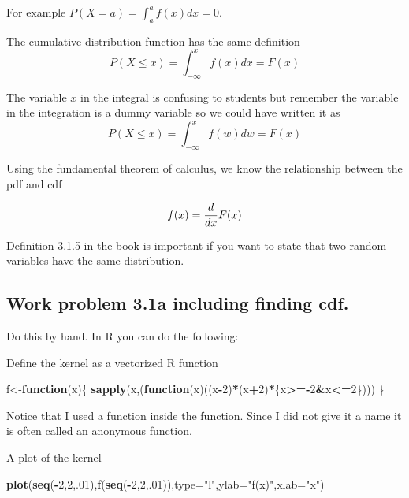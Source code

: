 \documentclass[]{book}
\newenvironment{Shaded}{\begin{snugshade}}{\end{snugshade}}
\newcommand{\KeywordTok}[1]{\textcolor[rgb]{0.13,0.29,0.53}{\textbf{#1}}}
\newcommand{\DataTypeTok}[1]{\textcolor[rgb]{0.13,0.29,0.53}{#1}}
\newcommand{\DecValTok}[1]{\textcolor[rgb]{0.00,0.00,0.81}{#1}}
\newcommand{\StringTok}[1]{\textcolor[rgb]{0.31,0.60,0.02}{#1}}
\newcommand{\ControlFlowTok}[1]{\textcolor[rgb]{0.13,0.29,0.53}{\textbf{#1}}}
\newcommand{\OperatorTok}[1]{\textcolor[rgb]{0.81,0.36,0.00}{\textbf{#1}}}
\newcommand{\NormalTok}[1]{#1}
\theoremstyle{definition}
\theoremstyle{definition}
\theoremstyle{definition}
\theoremstyle{remark}
\begin{document}
For example \(P(X=a)=\int_{a}^{a}f(x)dx=0\).

The cumulative distribution function has the same definition
\[P(X\leq x)=\int_{-\infty}^{x}f(x)dx=F(x)\]

The variable \(x\) in the integral is confusing to students but remember
the variable in the integration is a dummy variable so we could have
written it as\\
\[P(X\leq x)=\int_{-\infty}^{x}f(w)dw=F(x)\]

Using the fundamental theorem of calculus, we know the relationship
between the pdf and cdf

\[f(x)={d \over dx}F(x)\]

Definition 3.1.5 in the book is important if you want to state that two
random variables have the same distribution.

\subsection{Work problem 3.1a including finding
cdf.}\label{work-problem-3.1a-including-finding-cdf.}

Do this by hand. In R you can do the following:

Define the kernel as a vectorized R function

\begin{Shaded}
\begin{Highlighting}[]
\NormalTok{f<-}\ControlFlowTok{function}\NormalTok{(x)\{}
    \KeywordTok{sapply}\NormalTok{(x,(}\ControlFlowTok{function}\NormalTok{(x)((x}\OperatorTok{-}\DecValTok{2}\NormalTok{)}\OperatorTok{*}\NormalTok{(x}\OperatorTok{+}\DecValTok{2}\NormalTok{)}\OperatorTok{*}\NormalTok{\{x}\OperatorTok{>=-}\DecValTok{2}\OperatorTok{&}\NormalTok{x}\OperatorTok{<=}\DecValTok{2}\NormalTok{\})))}
\NormalTok{\}}
\end{Highlighting}
\end{Shaded}

Notice that I used a function inside the function. Since I did not give
it a name it is often called an anonymous function.

A plot of the kernel

\begin{Shaded}
\begin{Highlighting}[]
\KeywordTok{plot}\NormalTok{(}\KeywordTok{seq}\NormalTok{(}\OperatorTok{-}\DecValTok{2}\NormalTok{,}\DecValTok{2}\NormalTok{,.}\DecValTok{01}\NormalTok{),}\KeywordTok{f}\NormalTok{(}\KeywordTok{seq}\NormalTok{(}\OperatorTok{-}\DecValTok{2}\NormalTok{,}\DecValTok{2}\NormalTok{,.}\DecValTok{01}\NormalTok{)),}\DataTypeTok{type=}\StringTok{"l"}\NormalTok{,}\DataTypeTok{ylab=}\StringTok{"f(x)"}\NormalTok{,}\DataTypeTok{xlab=}\StringTok{"x"}\NormalTok{)}
\end{Highlighting}
\end{Shaded}
\end{document}
